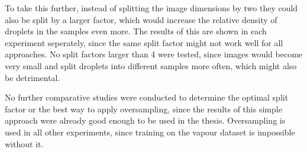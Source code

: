 To take this further, instead of splitting the image dimensions by two they could also be split by a larger factor, which would increase the relative density of droplets in the samples even more.
The results of this are shown in each experiment seperately, since the same split factor might not work well for all approaches.
No split factors larger than 4 were tested, since images would become very small and split droplets into different samples more often, which might also be detrimental. 

No further comparative studies were conducted to determine the optimal split factor or the best way to apply oversampling, since the results of this simple approach were already good enough to be used in the thesis.
Oversampling is used in all other experiments, since training on the vapour dataset is impossible without it.


